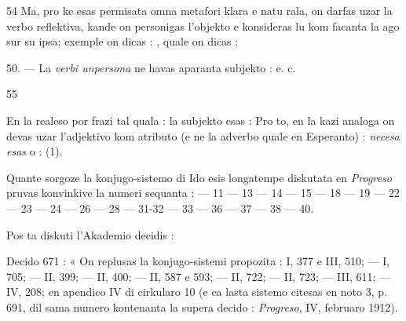 \begin{VUpage}[58]{54}
Ma, pro ke esas permisata omna metafori klara e natu\cc
rala, on darfas uzar la verbo reflektiva, kande on personigas\nl
l'objekto e konsideras lu kom facanta la ago sur su ipsa;\nl
exemple on dicas : , quale on\nl
dicas : 

\VUblanc{4.73pt}%
50. --- La \textit{verbi unpersona} ne havas aparanta subjekto :\nl
{}\nl
{} e. c.
\end{VUpage}

\begin{VUpage}[59]{55}

En la realeso por frazi tal quala : \nl
la subjekto esas :  Pro to, en la kazi analoga\nl
on devas uzar l'adjektivo kom atributo (e ne la adverbo\nl
quale en Esperanto) : \textit{necesa esas} o : \nl
{} (1).

\VUblanc{11.09pt}%
Quante sorgoze la konjugo-sistemo di Ido esis longatempe\nl
diskutata en \textit{Progreso} pruvas konvinkive la numeri sequanta : --- 11 --- 13 --- 14 --- 15 --- 18 --- 19 --- 22 --- 23\nl
--- 24 --- 26 --- 28 --- 31-32 --- 33 --- 36 --- 37 --- 38 --- 40.

\VUblanc{2.97pt}%
Pos ta diskuti l'Akademio decidis :

\VUblancAlinea
Decido 671 : « On replusas la konjugo-sistemi propozita :\nl
I, 377 e III, 510; --- I, 705; --- II, 399; --- II, 400; ---\nl
II, 587 e 593; --- II, 722; --- II, 723; --- III, 611; ---\nl
IV, 208; en apendico IV di cirkularo 10 (e ca lasta sistemo\nl
citesas en noto 3, p. 691, dil sama numero kontenanta la\nl
supera decido : \textit{Progreso}, IV, februaro 1912).


\end{VUpage}
